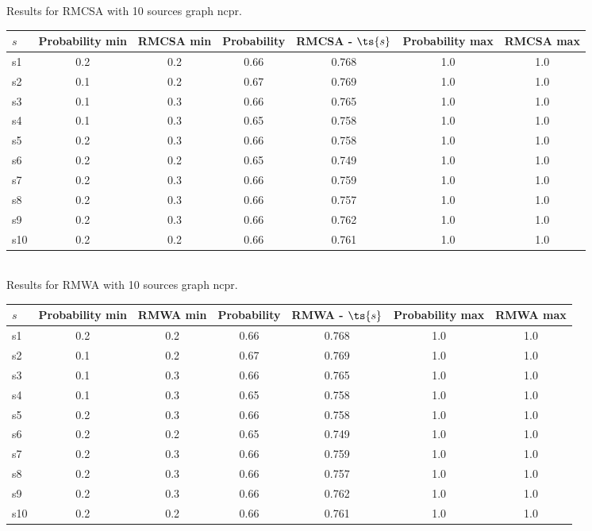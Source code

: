 \documentclass{article}
\begin{document}
\noindent Results for RMCSA with 10 sources graph ncpr.

\noindent\begin{tabular}{|l|c|c|c|c|c|c|}
\hline
$s$& Probability min & RMCSA min & Probability & RMCSA - $\ts{s}$ & Probability max & RMCSA max\\
\hline
s1 &0.2 & 0.2 & 0.66 & 0.768 & 1.0 & 1.0\\
\hline
s2 &0.1 & 0.2 & 0.67 & 0.769 & 1.0 & 1.0\\
\hline
s3 &0.1 & 0.3 & 0.66 & 0.765 & 1.0 & 1.0\\
\hline
s4 &0.1 & 0.3 & 0.65 & 0.758 & 1.0 & 1.0\\
\hline
s5 &0.2 & 0.3 & 0.66 & 0.758 & 1.0 & 1.0\\
\hline
s6 &0.2 & 0.2 & 0.65 & 0.749 & 1.0 & 1.0\\
\hline
s7 &0.2 & 0.3 & 0.66 & 0.759 & 1.0 & 1.0\\
\hline
s8 &0.2 & 0.3 & 0.66 & 0.757 & 1.0 & 1.0\\
\hline
s9 &0.2 & 0.3 & 0.66 & 0.762 & 1.0 & 1.0\\
\hline
s10 &0.2 & 0.2 & 0.66 & 0.761 & 1.0 & 1.0\\
\hline
\end{tabular}\\

\noindent Results for RMWA with 10 sources graph ncpr.

\noindent\begin{tabular}{|l|c|c|c|c|c|c|}
\hline
$s$& Probability min & RMWA min & Probability & RMWA - $\ts{s}$ & Probability max & RMWA max\\
\hline
s1 &0.2 & 0.2 & 0.66 & 0.768 & 1.0 & 1.0\\
\hline
s2 &0.1 & 0.2 & 0.67 & 0.769 & 1.0 & 1.0\\
\hline
s3 &0.1 & 0.3 & 0.66 & 0.765 & 1.0 & 1.0\\
\hline
s4 &0.1 & 0.3 & 0.65 & 0.758 & 1.0 & 1.0\\
\hline
s5 &0.2 & 0.3 & 0.66 & 0.758 & 1.0 & 1.0\\
\hline
s6 &0.2 & 0.2 & 0.65 & 0.749 & 1.0 & 1.0\\
\hline
s7 &0.2 & 0.3 & 0.66 & 0.759 & 1.0 & 1.0\\
\hline
s8 &0.2 & 0.3 & 0.66 & 0.757 & 1.0 & 1.0\\
\hline
s9 &0.2 & 0.3 & 0.66 & 0.762 & 1.0 & 1.0\\
\hline
s10 &0.2 & 0.2 & 0.66 & 0.761 & 1.0 & 1.0\\
\hline
\end{tabular}\\
\end{document}
